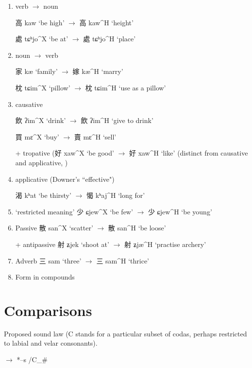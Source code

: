 \documentclass[oldfontcommands,oneside,a4paper,11pt]{article}
\newcommand{\ipa}[1]{{\phon \mbox{#1}}} %
\newcommand{\zh}[1]{{\cn #1}}
\newcommand{\ch}[3]{\zh{#1} \ipa{#2} `#3'}
\begin{document}
\begin{enumerate}
\item verb $\rightarrow$ noun 


\ch{高}{kaw}{be high} $\rightarrow$ \ch{高}{kaw^H}{height} 

\ch{處}{tɕʰjo^X}{be at} $\rightarrow$ \ch{處}{tɕʰjo^H}{place} 

\item noun $\rightarrow$ verb 

\ch{家}{kæ}{family} $\rightarrow$ \ch{嫁}{kæ^H}{marry} 

\ch{枕}{tɕim^X}{pillow} $\rightarrow$ \ch{枕}{tɕim^H}{use as a pillow} 

\item causative

\ch{飲}{ʔim^X}{drink} $\rightarrow$ \ch{飲}{ʔim^H}{give to drink} 

\ch{買}{mɛ^X}{buy} $\rightarrow$ \ch{賣}{mɛ^H}{sell} 


+ tropative (\ch{好}{xaw^X}{be good} $\rightarrow$ \ch{好}{xaw^H}{like} (distinct from causative and applicative, \citealt{jacques13tropative})
\item applicative (Downer's ``effective")

\ch{渴}{kʰat}{be thirsty} $\rightarrow$ \ch{愒}{kʰaj^H}{long for} 

\item `restricted meaning'
\ch{少}{ɕjew^X}{be few} $\rightarrow$ \ch{少}{ɕjew^H}{be young} 

\item Passive
\ch{散}{san^X}{scatter} $\rightarrow$ \ch{散}{san^H}{be loose} 

+ antipassive \ch{射}{ʑjek}{shoot at} $\rightarrow$ \ch{射}{ʑjæ^H}{practise archery} 

\item Adverb
\ch{三}{sam}{three} $\rightarrow$ \ch{三}{sam^H}{thrice} 

\item Form in compounds
\end{enumerate}

\section{Comparisons}
Proposed sound law (C stands for a particular subset of codas, perhaps restricted to labial and velar consonants).

\begin{exe}
\ex \label{ex:ts}
\glt *\ipa{--t} $\rightarrow$ *\ipa{--s} /C\_\# 
\end{exe}
\end{document}
